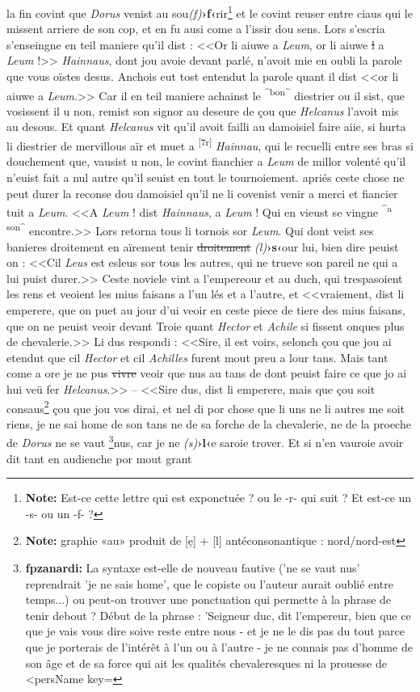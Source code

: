 \documentclass[12pt]{article} %
\newcommand{\foliomar}[2]{\marginnote{\href{#2}{[#1]}}}
\newcommand{\foliomarID}[1]{\textsuperscript{[#1]}} %
\newcommand{\persName}[1]{\emph{#1}} %
\newcommand{\corr}[2]{\emph{(#1)}\textbf{›#2‹}} %
\newcommand{\add}[1]{\textsuperscript{#1}}       %
\newcommand{\fnnote}[1]{\footnote{\textbf{Note:} #1}} %
\newcommand{\fnfpz}[1]{\footnote{\textbf{fpzanardi:} #1}} %
\newcommand{\del}[1]{\sout{#1}}      %
\begin{document}
la fin covint que \persName{Dorus} venist au sou\corr{f}{f}rir\fnnote{Est-ce cette lettre qui est exponctuée ? ou le -r- qui suit ? Et est-ce un -s- ou un -f- ?} et le covint reuser entre ciaus qui le missent arriere de son cop, et en fu ausi come a l'issir dou sens. Lors s'escria s'enseingne en teil maniere qu'il dist : <<Or li aiuwe a \persName{Leum}, or li aiuwe \del{l} a \persName{Leum} !>> \persName{Hainnaus}, dont jou avoie devant parlé, n'avoit mie en oubli la parole que vous oïstes desus. Anchois eut tost entendut la parole quant il dist <<or li aiuwe a \persName{Leum}.>> Car il en teil maniere achainst le \add{^bon^} diestrier ou il sist, que vosissent il u non, remist son signor au deseure de çou que \persName{Helcanus} l'avoit mis au desous. Et quant \persName{Helcanus} vit qu'il avoit failli au damoisiel faire aiie, si hurta li diestrier de mervillous aïr et muet a \foliomar{7ra}{https://gallica.bnf.fr/ark:/12148/btv1b10023851v/f19.image} \foliomarID{7r} \persName{Hainnau}, qui le recuelli entre ses bras si douchement que, vausist u non, le covint fianchier a \persName{Leum} de millor volenté qu'il n'euist fait a nul autre qu'il seuist en tout le tournoiement. apriés ceste chose ne peut durer la reconse dou damoisiel qu'il ne li covenist venir a merci et fiancier tuit a \persName{Leum}. <<A \persName{Leum} ! dist \persName{Hainnaus}, a \persName{Leum} ! Qui en vieust se vingne \add{^a son^} encontre.>> Lors retorna tous li tornois sor \persName{Leum}. Qui dont veist ses banieres droitement en aïrement tenir \del{droitement} \corr{l}{s}our lui, bien dire peuist on : <<Cil \persName{Leus} est esleus sor tous les autres, qui ne trueve son pareil ne qui a lui puist durer.>> Ceste noviele vint a l'empereour et au duch, qui trespasoient les rens et veoient les mius faisans a l'un lés et a l'autre, et <<vraiement, dist li emperere, que on puet au jour d'ui veoir en ceste piece de tiere des mius faisans, que on ne peuist veoir devant Troie quant \persName{Hector} et \persName{Achile} si fissent onques plus de chevalerie.>> Li dus respondi : <<Sire, il est voirs, selonch çou que jou ai etendut que cil \persName{Hector} et cil \persName{Achilles} furent mout preu a lour tans. Mais tant come a ore je ne pus \del{vivre} veoir que nus au tans de dont peuist faire ce que jo ai hui veü fer \persName{Helcanus}.>> -- <<Sire dus, dist li emperere, mais que çou soit consaus\fnnote{ graphie «au» produit de [ẹ] + [l] antéconsonantique : nord/nord-est} çou que jou vos dirai, et nel di por chose que li uns ne li autres me soit riens, je ne sai home de son tans ne de sa forche de la chevalerie, ne de la proeche de \persName{Dorus} ne se vaut \fnfpz{La syntaxe est-elle de nouveau fautive ('ne se vaut nus' reprendrait 'je ne sais home', que le copiste ou l'auteur aurait oublié entre temps...) ou peut-on trouver une ponctuation qui permette à la phrase de tenir debout ? Début de la phrase : 'Seigneur duc, dit l'empereur, bien que ce que je vais vous dire soive reste entre nous - et je ne le dis pas du tout parce que je porterais de l'intérêt à l'un ou à l'autre - je ne connais pas d'homme de son âge et de sa force qui ait les qualités chevaleresques ni la prouesse de <persName key=}nus, car je ne \corr{s}{l}e saroie trover. Et si n'en vauroie avoir dit tant en audienche por mout grant 
\end{document}
